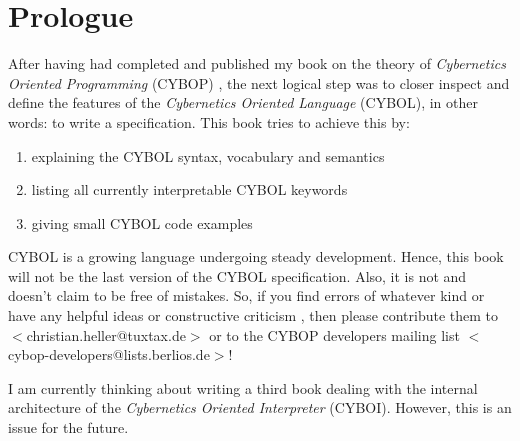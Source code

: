 %
%
%
%
%
%

\section*{Prologue}
\label{prologue_heading}

After having had completed and published my book on the theory of
\emph{Cybernetics Oriented Programming} (CYBOP) \cite{cybopbook}, the next
logical step was to closer inspect and define the features of the
\emph{Cybernetics Oriented Language} (CYBOL), in other words: to write a
specification. This book tries to achieve this by:

\begin{enumerate}
    \item explaining the CYBOL syntax, vocabulary and semantics
    \item listing all currently interpretable CYBOL keywords
    \item giving small CYBOL code examples
\end{enumerate}

CYBOL is a growing language undergoing steady development. Hence, this book
will not be the last version of the CYBOL specification. Also, it is not and
doesn't claim to be free of mistakes. So, if you find errors of whatever kind
or have any helpful ideas or constructive criticism \cite{hackermanifesto}, then
please contribute them to \(<\)christian.heller@tuxtax.de\(>\) or to the CYBOP
developers mailing list \(<\)cybop-developers@lists.berlios.de\(>\)!

I am currently thinking about writing a third book dealing with the internal
architecture of the \emph{Cybernetics Oriented Interpreter} (CYBOI). However,
this is an issue for the future.
